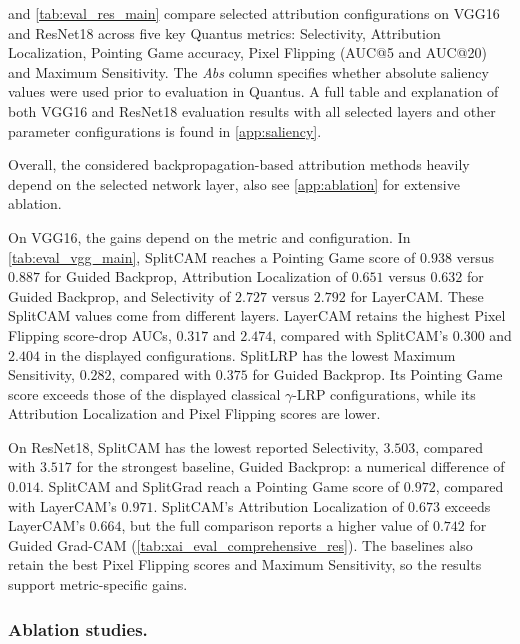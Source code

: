  and \cref{tab:eval_res_main} compare selected attribution configurations on VGG16 and ResNet18 across five key Quantus metrics: Selectivity, Attribution Localization, Pointing Game accuracy, Pixel Flipping (AUC@5 and AUC@20) and Maximum Sensitivity.
The \emph{Abs} column specifies whether absolute saliency values were used prior to evaluation in Quantus.
A full table and explanation of both VGG16 and ResNet18 evaluation results with all selected layers and other parameter configurations is found in \cref{app:saliency}.

Overall, the considered backpropagation-based attribution methods heavily depend on the selected network layer, also see \cref{app:ablation} for extensive ablation.

On VGG16, the gains depend on the metric and configuration. In \cref{tab:eval_vgg_main}, SplitCAM reaches a Pointing Game score of $0.938$ versus $0.887$ for Guided Backprop, Attribution Localization of $0.651$ versus $0.632$ for Guided Backprop, and Selectivity of $2.727$ versus $2.792$ for LayerCAM. These SplitCAM values come from different layers.
LayerCAM retains the highest Pixel Flipping score-drop AUCs, $0.317$ and $2.474$, compared with SplitCAM's $0.300$ and $2.404$ in the displayed configurations. SplitLRP has the lowest Maximum Sensitivity, $0.282$, compared with $0.375$ for Guided Backprop. Its Pointing Game score exceeds those of the displayed classical $\gamma$-LRP configurations, while its Attribution Localization and Pixel Flipping scores are lower.

On ResNet18, SplitCAM has the lowest reported Selectivity, $3.503$, compared with $3.517$ for the strongest baseline, Guided Backprop: a numerical difference of $0.014$. SplitCAM and SplitGrad reach a Pointing Game score of $0.972$, compared with LayerCAM's $0.971$. SplitCAM's Attribution Localization of $0.673$ exceeds LayerCAM's $0.664$, but the full comparison reports a higher value of $0.742$ for Guided Grad-CAM (\cref{tab:xai_eval_comprehensive_res}). The baselines also retain the best Pixel Flipping scores and Maximum Sensitivity, so the results support metric-specific gains.

\subsubsection{Ablation studies.} \label{subsec:ablation}



